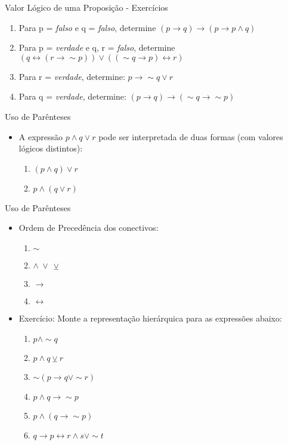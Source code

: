 \begin{frame}[t]{Valor Lógico de uma Proposição - Exercícios} %
	\begin{enumerate}
	\item Para p = {\em falso} e q = {\em falso}, determine $(p \rightarrow q) \rightarrow (p \rightarrow p \wedge q)$
	\item Para p = {\em verdade} e q, r = {\em falso}, determine $(q \leftrightarrow (r \rightarrow \sim p)) \vee ((\sim q \rightarrow p) \leftrightarrow r)$
	\item Para r = {\em verdade}, determine: $p \rightarrow \sim q \vee r$
	\item Para q = {\em verdade}, determine: $(p \rightarrow q) \rightarrow (\sim q \rightarrow \sim p)$
	\end{enumerate}
\end{frame}

\begin{frame}[t]{Uso de Parênteses} %
	\begin{itemize}
	\item A expressão $p \wedge q \vee r$ pode ser interpretada de duas formas (com valores lógicos distintos):
	\begin{enumerate}
	\item $(p \wedge q) \vee r$
	\item $p \wedge (q \vee r)$
	\end{enumerate}

	\begin{figure}
	\end{figure}
	\end{itemize}
\end{frame}

\begin{frame}[t]{Uso de Parênteses} %
	\begin{itemize}
	\item Ordem de Precedência dos conectivos:
	\begin{enumerate}
	\item $\sim$
	\item $\wedge ~ \vee ~ \veebar$
	\item $\rightarrow$
	\item $\leftrightarrow$
	\end{enumerate}

	\item {\sc Exercício:} Monte a representação hierárquica para as expressões abaixo:
	\begin{enumerate}
	\item $p \wedge \sim q$
	\item $p \wedge q \veebar r$
	\item $\sim (p \rightarrow q \vee \sim r)$
	\item $p \wedge q \rightarrow \sim p$
	\item $p \wedge (q \rightarrow \sim p)$
	\item $q \rightarrow p \leftrightarrow r \wedge s \vee \sim t$
	\end{enumerate}
	\end{itemize}
\end{frame}

